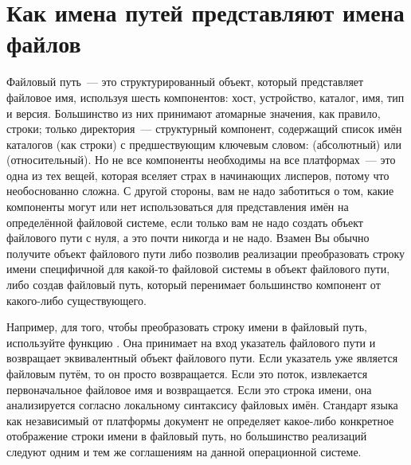 
\section{Как имена путей представляют имена файлов}

Файловый путь~--- это структурированный объект, который представляет файловое имя,
используя шесть компонентов: хост, устройство, каталог, имя, тип и версия. Большинство из
них принимают атомарные значения, как правило, строки; только директория~--- структурный
компонент, содержащий список имён каталогов (как строки) с предшествующим ключевым словом:
 (абсолютный) или  (относительный). Но не все компоненты
необходимы на все платформах~--- это одна из тех вещей, которая вселяет страх в начинающих
лисперов, потому что необоснованно сложна. С другой стороны, вам не надо заботиться о том,
какие компоненты могут или нет использоваться для представления имён на определённой
файловой системе, если только вам не надо создать объект файлового пути с нуля, а это
почти никогда и не надо. Взамен Вы обычно получите объект файлового пути либо позволив
реализации преобразовать строку имени специфичной для какой-то файловой системы в объект
файлового пути, либо создав файловый путь, который перенимает большинство компонент от
какого-либо существующего.

Например, для того, чтобы преобразовать строку имени в файловый путь, используйте функцию
. Она принимает на вход указатель файлового пути и возвращает эквивалентный
объект файлового пути. Если указатель уже является файловым путём, то он просто
возвращается. Если это поток, извлекается первоначальное файловое имя и возвращается. Если
это строка имени, она анализируется согласно локальному синтаксису файловых имён. Стандарт
языка как независимый от платформы документ не определяет какое-либо конкретное
отображение строки имени в файловый путь, но большинство реализаций следуют одним и тем же
соглашениям на данной операционной системе.

